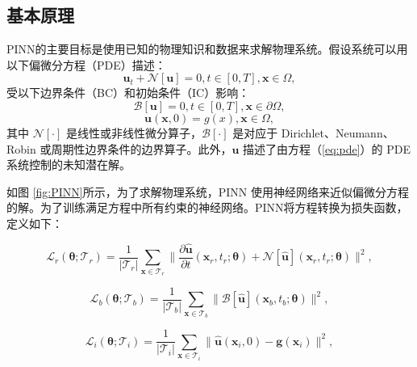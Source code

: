 \subsection{基本原理}

PINN的主要目标是使用已知的物理知识和数据来求解物理系统。假设系统可以用以下偏微分方程（PDE）描述：
\begin{equation}
    \label{eq:pde}
    \boldsymbol{u}_t+\mathcal{N}[\boldsymbol{u}]=0,t\in[0,T],\boldsymbol{x}\in\Omega,
\end{equation}
受以下边界条件（BC）和初始条件（IC）影响：
\begin{equation}\label{eq:bc}\mathcal{B}[\boldsymbol{u}]=0,t\in[0,T],\boldsymbol{x}\in\partial\Omega,\end{equation}
\begin{equation}\label{eq:ic}\boldsymbol{u}(\boldsymbol{x},0)=g(x),\boldsymbol{x}\in\Omega,\end{equation}
其中 $\mathcal{N}[·]$ 是线性或非线性微分算子，$\mathcal{B}[·]$ 是对应于 Dirichlet、Neumann、Robin 或周期性边界条件的边界算子。此外，$\boldsymbol{u}$ 描述了由方程（\ref{eq:pde}）的 PDE 系统控制的未知潜在解。

如图 \ref{fig:PINN}所示，为了求解物理系统，PINN 使用神经网络来近似偏微分方程的解。为了训练满足方程中所有约束的神经网络。PINN将方程转换为损失函数，定义如下：

\begin{equation}
    \label{eq:pde_loss}
    \mathcal{L}_r(\boldsymbol{\theta};\mathcal{T} _r)=\frac1{|\mathcal{T}_r|}\sum_{\boldsymbol{x}\in \mathcal{T}_r}\|\frac{\partial \boldsymbol{\hat{u}}}{\partial t}(\boldsymbol{x}_r,t_r;\boldsymbol{\theta})+\mathcal{N}[\boldsymbol{\hat{u}}](\boldsymbol{x}_r,t_r;\boldsymbol{\theta})\|^2,
\end{equation}

\begin{equation}
    \label{eq:bc_loss}
    \mathcal{L}_b(\boldsymbol{\theta};\mathcal{T} _b)=\frac1{|\mathcal{T}_b|}\sum_{\boldsymbol{x}\in \mathcal{T}_b}\|\mathcal{B}[\boldsymbol{\hat{u}}](\boldsymbol{x}_b,t_b;\boldsymbol{\theta})\|^2,
\end{equation}

\begin{equation}
    \label{eq:ic_loss}
    \mathcal{L}_i(\boldsymbol{\theta};\mathcal{T} _i)=\frac1{|\mathcal{T}_i|}\sum_{\boldsymbol{x}\in \mathcal{T}_i}\|\boldsymbol{\hat{u}}(\boldsymbol{x}_i,0)-\boldsymbol{g}(\boldsymbol{x}_i)\|^2,
\end{equation}

